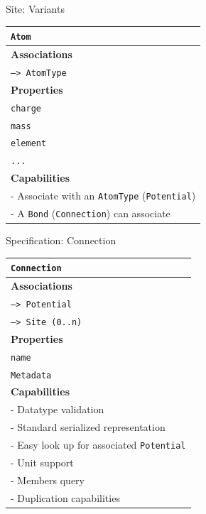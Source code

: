 \documentclass[xcolor=table]{beamer}
\begin{document}
\begin{frame}{Site: Variants}
\begin{table}[ht]
    \centering
    \begin{tabular}{|l|}
         \hline
         \rowcolor{gray!50}
         \texttt{Atom}  \\
         \hline
         \textbf{Associations} \\
         \hline
         \texttt{--> AtomType}\\
         \textbf{Properties}\\
         \hline
         \texttt{charge} \\
         \texttt{mass} \\
         \texttt{element}\\
         \texttt{...}\\
         \hline
         \textbf{Capabilities}\\
         \hline
         - Associate with an \texttt{AtomType} (\texttt{Potential})\\
         - A \texttt{Bond} (\texttt{Connection}) can associate\\
        \hline
    \end{tabular}
\end{table}
\end{frame}

\begin{frame}{Specification: Connection}

\begin{table}[ht]
    \centering
    \begin{tabular}{|l|}
         \hline
         \rowcolor{gray!50}
         \texttt{Connection}  \\
         \hline
         \textbf{Associations} \\
         \hline
         \texttt{--> Potential}\\
         \texttt{--> Site (0..n)}\\
         \textbf{Properties}\\
         \hline
         \texttt{name} \\
         \texttt{Metadata}\\
         \hline
         \textbf{Capabilities}\\
         \hline
         - Datatype validation \\
         - Standard serialized representation \\
         - Easy look up for associated \texttt{Potential} \\
         - Unit support \\
         - Members query \\
         - Duplication capabilities \\
        \hline
    \end{tabular}
    \label{tab:ConnSpec}
\end{table}

\end{frame}
\end{document}

